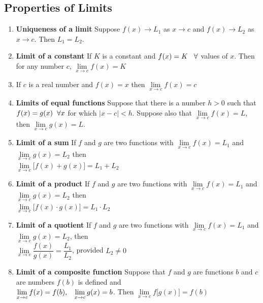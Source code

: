 \documentclass[11pt,a4paper]{article}
\theoremstyle{definition}
\begin{document}
\subsection{Properties of Limits}

\begin{enumerate}
\item \textbf{Uniqueness of a limit}
Suppose $f(x) \longrightarrow L_1$ as $x \longrightarrow c$ and $f(x) \longrightarrow L_2$ as $x\longrightarrow c$. Then $L_1 = L_2$.

\item \textbf{Limit of a constant}
If $K$ is a constant and $f(x) = K\hspace{0.3cm} \forall$ values of $x$. Then for any number $c$, $\lim\limits_{x \rightarrow c} f(x) = K$

\item If $c$ is a real number and $f(x) = x$ then \hspace{0.2cm}$\displaystyle{\lim\limits_{x\rightarrow c} f(x) = c}$ 

\item \textbf{Limits of equal functions}
Suppose that there is a number $h>0$ such that $f(x) = g(x)\hspace{0.2cm} \forall x$ for which $\left|x - c\right| < h$. Suppose also that $\lim\limits_{x\rightarrow c} f(x) = L$, then $\lim\limits_{x\rightarrow c} g(x) = L$.

\item\textbf{Limit of a sum}
If $f$ and $g$ are two functions with $\lim\limits_{x\rightarrow c} f(x) = L_1$ and $\lim\limits_{x\rightarrow c} g(x) = L_2$ then\\ $\lim\limits_{x\rightarrow c} \Big[ f(x) + g(x)\Big] = L_1 +L_2$

\item \textbf{Limit of a product}
If $f$ and $g$ are two functions with $\lim\limits_{x\rightarrow c} f(x) = L_1$ and $\lim\limits_{x\rightarrow c} g(x) = L_2$ then\\ $\lim\limits_{x\rightarrow c} \big[f(x)\cdot g(x)\big] = L_1\cdot L_2$

\item \textbf{Limit of a quotient}
If $f$ and $g$ are two functions with $\lim\limits_{x\rightarrow c} f(x) = L_1$ and $\lim\limits_{x\rightarrow c} g(x) = L_2$, then \\ $\lim\limits_{x\rightarrow c}\dfrac{f(x)}{g(x)} = \dfrac{L_1}{L_2}$, provided $L_2\neq 0$

\item \textbf{Limit of a composite function}
Suppose that $f$ and $g$ are functions $b$ and $c$ are numbers $f(b)$ is defined and\\ $\lim\limits_{x\rightarrow c} f(x) = f(b),\hspace{0.3cm}\lim\limits_{x\rightarrow c} g(x) = b$. Then $\lim\limits_{x\rightarrow c} f\big[g(x)\big] = f(b)$


\end{enumerate}
\end{document}
